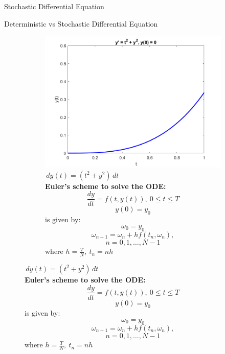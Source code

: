 \documentclass[final]{beamer}
\newlength{\colwidth}
\begin{document}
\begin{frame}[t]
\begin{columns}[t]
\begin{column}{\colwidth}
\begin{block}{Stochastic Differential Equation}
  \end{block}
  \begin{block}{Deterministic vs Stochastic Differential Equation}
  \begin{figure}[htbp]
  \centering
  \begin{subfigure}[b]{0.47\textwidth}
    \includegraphics[width=\textwidth]{figures/deterministic_SDE.png}
    \caption{$\,dy(t) = (t^2 + y^2)\,dt$\\
    \textbf{Euler's scheme to solve the ODE:}
      \[\frac{dy}{dt} = f(t,y(t)),\ 0 \leq t \leq T\]
      \[y(0) = y_0\]
      is given by:
      \[\omega_0 = y_0\]
      \[\omega_{n+1} = \omega_n + hf(t_n,\omega_n),\]
      \[n=0,1,\dots,N-1\] 
      where $h=\frac{T}{N}, \ t_n = nh$
       }
    

\end{subfigure}
\end{figure}
\end{block}
\end{column}
\end{columns}
\end{frame}
\end{document}
